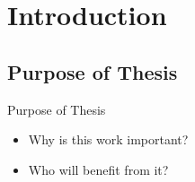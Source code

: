 \documentclass[xcolor={table}]{beamer}
\title[Thesis presentation]{\thetitle} %
\author{André Danielsson} %
\institute[KTH] %
{%
\textit{anddani@kth.se}\\ %
\medskip
Royal Institute of Technology\\
Computer Science and Communication\\ %
}
\date{\today} %
\begin{document}




\begin{frame}
\titlepage%
\end{frame}


\section{Introduction}
\subsection{Purpose of Thesis}
\begin{frame}{Purpose of Thesis}
    \begin{itemize}
        \item Why is this work important?
        \item Who will benefit from it?
    \end{itemize}
\end{frame}
\end{document}
